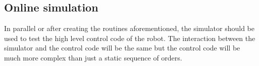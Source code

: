 \subsection{Online simulation}
In parallel or after creating the routines aforementioned, the simulator should be used to test the high level control code of the robot. The interaction between the simulator and the control code will be the same but the control code will be much more complex than just a static sequence of orders.

